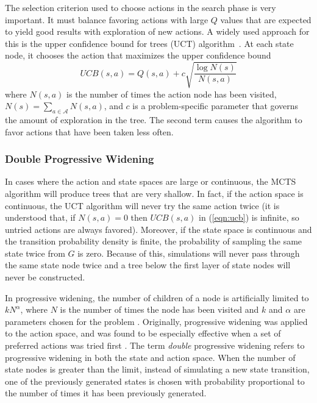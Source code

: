 The selection criterion used to choose actions in the search phase is very important.
It must balance favoring actions with large $Q$ values that are expected to yield good results with exploration of new actions.
A widely used approach for this is the upper confidence bound for trees (UCT) algorithm~\cite{browne2012survey}.
At each state node, it chooses the action that maximizes the upper confidence bound
\begin{equation} \label{eqn:ucb}
    UCB(s,a) = Q(s,a) + c \sqrt{\frac{\log N(s)}{N(s,a)}}
\end{equation}
where $N(s,a)$ is the number of times the action node has been visited, $N(s) = \sum_{a \in \mathcal{A}} N(s,a)$, and $c$ is a problem-specific parameter that governs the amount of exploration in the tree.
The second term causes the algorithm to favor actions that have been taken less often.

\subsubsection{Double Progressive Widening} \label{sec:dpw}

In cases where the action and state spaces are large or continuous, the MCTS algorithm will produce trees that are very shallow.
In fact, if the action space is continuous, the UCT algorithm will never try the same action twice (it is understood that, if $N(s,a) = 0$ then $UCB(s,a)$ in (\ref{eqn:ucb}) is infinite, so untried actions are always favored).
Moreover, if the state space is continuous and the transition probability density is finite, the probability of sampling the same state twice from $G$ is zero.
Because of this, simulations will never pass through the same state node twice and a tree below the first layer of state nodes will never be constructed.

In progressive widening, the number of children of a node is artificially limited to $k N^\alpha$, where $N$ is the number of times the node has been visited and $k$ and $\alpha$ are parameters chosen for the problem \cite{couetoux2011double}.
Originally, progressive widening was applied to the action space, and was found to be especially effective when a set of preferred actions was tried first \cite{browne2012survey}.
The term \emph{double} progressive widening refers to progressive widening in both the state and action space.
When the number of state nodes is greater than the limit, instead of simulating a new state transition, one of the previously generated states is chosen with probability proportional to the number of times it has been previously generated.



